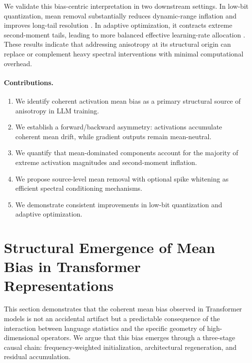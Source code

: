 We validate this bias-centric interpretation in two downstream settings. In low-bit quantization, mean removal substantially reduces dynamic-range inflation and improves long-tail resolution \citep{xiao2023, wei2023, ashkboos2024, cao2025}. In adaptive optimization, it contracts extreme second-moment tails, leading to more balanced effective learning-rate allocation \citep{kingma2014, huang2026}. These results indicate that addressing anisotropy at its structural origin can replace or complement heavy spectral interventions with minimal computational overhead.

\paragraph{Contributions.}
\begin{enumerate}
    \item We identify coherent activation mean bias as a primary structural source of anisotropy in LLM training.
    \item We establish a forward/backward asymmetry: activations accumulate coherent mean drift, while gradient outputs remain mean-neutral.
    \item We quantify that mean-dominated components account for the majority of extreme activation magnitudes and second-moment inflation.
    \item We propose source-level mean removal with optional spike whitening as efficient spectral conditioning mechanisms.
    \item We demonstrate consistent improvements in low-bit quantization and adaptive optimization.
\end{enumerate}

\section{Structural Emergence of Mean Bias in Transformer Representations}
\label{sec:structural_emergence}

This section demonstrates that the coherent mean bias observed in Transformer models is not an accidental artifact but a predictable consequence of the interaction between language statistics and the specific geometry of high-dimensional operators. We argue that this bias emerges through a three-stage causal chain: frequency-weighted initialization, architectural regeneration, and residual accumulation.

